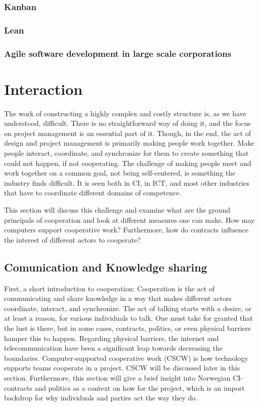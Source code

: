 \subsubsection{Kanban}
\subsubsection{Lean}
\subsubsection{Agile software development in large scale corporations}

\section{Interaction}
The work of constructing a highly complex and costly structure is, as we have understood, difficult. There is no straightforward way of doing it, and the focus on project management is an essential part of it. Though, in the end, the act of design and project management is primarily making people work together. Make people interact, coordinate, and synchronize for them to create something that could not happen, if not cooperating. The challenge of making people meet and work together on a common goal, not being self-centered, is something the industry finds difficult. It is seen both in CI, in ICT, and most other industries that have to coordinate different domains of competence. 

This section will discuss this challenge and examine what are the ground principals of cooperation and look at different measures one can make. How may computers support cooperative work? Furthermore, how do contracts influence the interest of different actors to cooperate? 

\subsection{Comunication and Knowledge sharing}
First, a short introduction to cooperation: Cooperation is the act of communicating and share knowledge in a way that makes different actors coordinate, interact, and synchronize. The act of talking starts with a desire, or at least a reason, for various individuals to talk. One must take for granted that the lust is there, but in some cases, contracts, politics, or even physical barriers hamper this to happen. Regarding physical barriers, the internet and telecommunication have been a significant leap towards decreasing the boundaries. Computer-supported cooperative work (CSCW) is how technology supports teams cooperate in a project. CSCW will be discussed later in this section. Furthermore, this section will give a brief insight into Norwegian CI- contracts and politics as a context on how for the project, which is an import backdrop for why individuals and parties act the way they do. 

